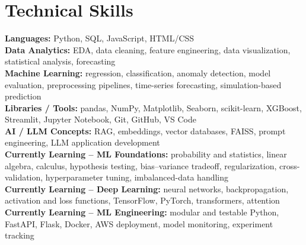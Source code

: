 \documentclass[10pt,a4paper]{article}
\begin{document}
\section{Technical Skills}
\small
\textbf{Languages:} Python, SQL, JavaScript, HTML/CSS\\
\textbf{Data Analytics:} EDA, data cleaning, feature engineering, data visualization, statistical analysis, forecasting\\
\textbf{Machine Learning:} regression, classification, anomaly detection, model evaluation, preprocessing pipelines, time-series forecasting, simulation-based prediction\\
\textbf{Libraries / Tools:} pandas, NumPy, Matplotlib, Seaborn, scikit-learn, XGBoost, Streamlit, Jupyter Notebook, Git, GitHub, VS Code\\
\textbf{AI / LLM Concepts:} RAG, embeddings, vector databases, FAISS, prompt engineering, LLM application development\\[2pt]
\textbf{Currently Learning -- ML Foundations:} probability and statistics, linear algebra, calculus, hypothesis testing, bias--variance tradeoff, regularization, cross-validation, hyperparameter tuning, imbalanced-data handling\\
\textbf{Currently Learning -- Deep Learning:} neural networks, backpropagation, activation and loss functions, TensorFlow, PyTorch, transformers, attention\\
\textbf{Currently Learning -- ML Engineering:} modular and testable Python, FastAPI, Flask, Docker, AWS deployment, model monitoring, experiment tracking
\end{document}
